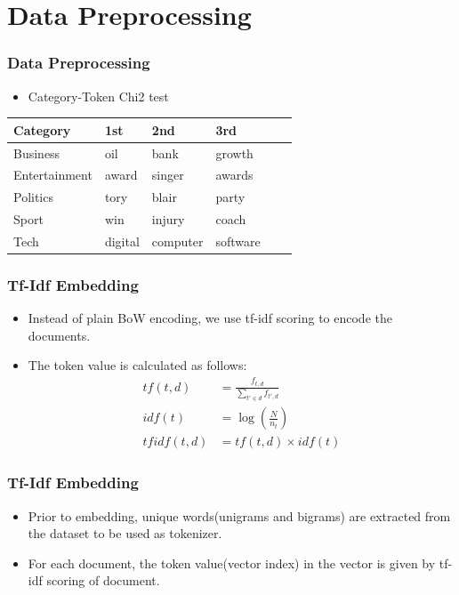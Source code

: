 \documentclass[
  10pt %
  16:9, %
]{beamer}
\begin{document}
\section{Data Preprocessing}
\frame
{
  \frametitle{Data Preprocessing}
  \begin{itemize}
  \item Category-Token Chi2 test
  \end{itemize}
  \begin{table}
  \centering
  \begin{tabular}{@{}llllll@{}}
    \toprule
    Category       & 1st       & 2nd      & 3rd      \\ \midrule
    Business       & oil       & bank     & growth   \\
    Entertainment  & award     & singer   & awards   \\
    Politics       & tory      & blair    & party    \\
    Sport          & win       & injury   & coach    \\
    Tech           & digital   & computer & software \\
    \bottomrule
  \end{tabular}
  \end{table}
}

\begin{frame}
  \frametitle{Tf-Idf Embedding}
  \begin{itemize}
  \item Instead of plain BoW encoding, we use tf-idf scoring to encode the documents.
  \item The token value is calculated as follows:
  \begin{align}
    tf(t,d) &= \frac{f_{t,d}}{\sum_{t' \in d} f_{t',d}} \\
    idf(t) &= \log\left(\frac{N}{n_t}\right) \\
    tfidf(t,d) &= tf(t,d) \times idf(t)
  \end{align}
  \end{itemize}
\end{frame}

\begin{frame}
  \frametitle{Tf-Idf Embedding}
  \begin{itemize}
  \item Prior to embedding, unique words(unigrams and bigrams) are extracted from the dataset to be used as tokenizer.
    \item For each document, the token value(vector index) in the vector is given by tf-idf scoring of document.
  \end{itemize}
\end{frame}
\end{document}
